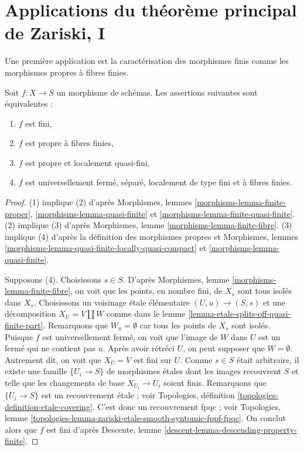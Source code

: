 \section{Applications du théorème principal de Zariski, I}
\label{section-applications-zmt}

\noindent
Une première application est la caractérisation des morphismes finis
comme les morphismes propres à fibres finies.

\begin{lemma}
\label{lemma-characterize-finite}
Soit $f : X \to S$ un morphisme de schémas.
Les assertions suivantes sont équivalentes :
\begin{enumerate}
\item $f$ est fini,
\item $f$ est propre à fibres finies,
\item $f$ est propre et localement quasi-fini,
\item $f$ est universellement fermé, séparé, localement de type fini
et à fibres finies.
\end{enumerate}
\end{lemma}

\begin{proof}
(1) implique (2) d'après
Morphismes, lemmes \ref{morphisms-lemma-finite-proper},
\ref{morphisms-lemma-quasi-finite}
et \ref{morphisms-lemma-finite-quasi-finite}.
(2) implique (3) d'après Morphismes, lemme \ref{morphisms-lemma-finite-fibre}.
(3) implique (4) d'après la définition des morphismes propres et
Morphismes, lemmes \ref{morphisms-lemma-quasi-finite-locally-quasi-compact} et
\ref{morphisms-lemma-quasi-finite}.

\medskip\noindent
Supposons (4). Choisissons $s \in S$. D'après
Morphismes, lemme \ref{morphisms-lemma-finite-fibre}, on
voit que les points, en nombre fini, de $X_s$ sont tous isolés dans $X_s$.
Choisissons un voisinage \'etale élémentaire $(U, u) \to (S, s)$
et une décomposition $X_U = V \amalg W$ comme dans le
lemme \ref{lemma-etale-splits-off-quasi-finite-part}.
Remarquons que $W_u = \emptyset$ car tous les points de $X_s$ sont isolés.
Puisque $f$ est universellement fermé, on voit que
l'image de $W$ dans $U$ est un fermé qui ne contient pas $u$.
Après avoir rétréci $U$, on peut supposer que $W = \emptyset$.
Autrement dit, on voit que $X_U = V$ est fini sur $U$.
Comme $s \in S$ était arbitraire,
il existe une famille $\{U_i \to S\}$
de morphismes \'etales dont les images recouvrent $S$ et telle que
les changements de base $X_{U_i} \to U_i$ soient finis.
Remarquons que $\{U_i \to S\}$ est un recouvrement \'etale ;
voir Topologies, définition \ref{topologies-definition-etale-covering}.
C'est donc un recouvrement fpqc ; voir
Topologies,
lemme \ref{topologies-lemma-zariski-etale-smooth-syntomic-fppf-fpqc}.
On conclut alors que $f$ est fini d'après
Descente, lemme \ref{descent-lemma-descending-property-finite}.
\end{proof}

